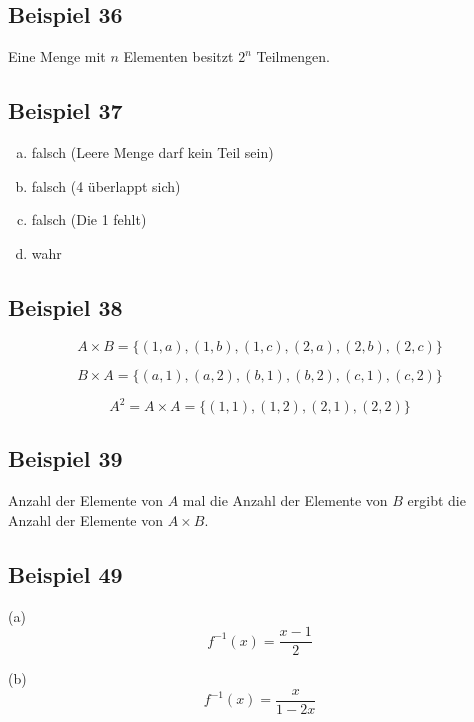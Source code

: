 \documentclass[12pt, a4paper, oneside]{article}
\begin{document}
\subsection{Beispiel 36}
Eine Menge mit $n$ Elementen besitzt $2^{n}$ Teilmengen.

\subsection{Beispiel 37}
\begin{enumerate}[(a)]
  \item falsch (Leere Menge darf kein Teil sein)
  \item falsch (4 überlappt sich)
  \item falsch (Die 1 fehlt)
  \item wahr
\end{enumerate}

\subsection{Beispiel 38}
\begin{equation*}
  A \times B = \{(1, a), (1, b), (1, c), (2, a), (2, b), (2, c)\} 
\end{equation*}

\begin{equation*}
  B \times A = \{(a, 1), (a, 2), (b, 1), (b, 2), (c, 1), (c, 2)\}
\end{equation*}

\begin{equation*}
  A^{2} = A \times A = \{(1, 1), (1, 2), (2, 1), (2, 2)\}
\end{equation*}

\subsection{Beispiel 39}
Anzahl der Elemente von $A$ mal die Anzahl der Elemente von $B$ ergibt die Anzahl der Elemente von $A \times B$.

\subsection{Beispiel 49} 
  (a)
  \begin{equation*}
    f^{-1}(x) = \frac{x - 1}{2}
  \end{equation*} 
 
  (b)
  \begin{equation*}
    f^{-1}(x) = \frac{x}{1 - 2x}
  \end{equation*}
\end{document}
